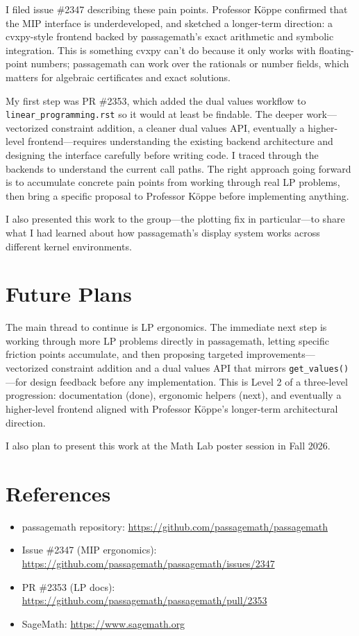 \documentclass[10pt]{article}
\begin{document}
I filed issue \#2347 describing these pain points. Professor K\"oppe confirmed that the MIP
interface is underdeveloped, and sketched a longer-term direction: a cvxpy-style frontend backed
by passagemath's exact arithmetic and symbolic integration. This is something cvxpy can't do
because it only works with floating-point numbers; passagemath can work over the rationals or
number fields, which matters for algebraic certificates and exact solutions.

My first step was PR \#2353, which added the dual values workflow to
\texttt{linear\_programming.rst} so it would at least be findable. The deeper work---vectorized
constraint addition, a cleaner dual values API, eventually a higher-level frontend---requires
understanding the existing backend architecture and designing the interface carefully before
writing code. I traced through the backends to understand the current call paths. The right
approach going forward is to accumulate concrete pain points from working through real LP
problems, then bring a specific proposal to Professor K\"oppe before implementing anything.

I also presented this work to the group---the plotting fix in particular---to share what I had
learned about how passagemath's display system works across different kernel environments.

\section{Future Plans}

The main thread to continue is LP ergonomics. The immediate next step is working through more LP
problems directly in passagemath, letting specific friction points accumulate, and then proposing
targeted improvements---vectorized constraint addition and a dual values API that mirrors
\texttt{get\_values()}---for design feedback before any implementation. This is Level 2 of a
three-level progression: documentation (done), ergonomic helpers (next), and eventually a
higher-level frontend aligned with Professor K\"oppe's longer-term architectural direction.

I also plan to present this work at the Math Lab poster session in Fall 2026.

\section{References}

\begin{itemize}
    \item passagemath repository: \url{https://github.com/passagemath/passagemath}
    \item Issue \#2347 (MIP ergonomics): \url{https://github.com/passagemath/passagemath/issues/2347}
    \item PR \#2353 (LP docs): \url{https://github.com/passagemath/passagemath/pull/2353}
    \item SageMath: \url{https://www.sagemath.org}
\end{itemize}
\end{document}
